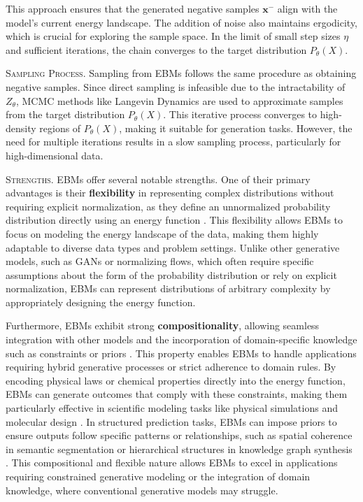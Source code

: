 This approach ensures that the generated negative samples \(\mathbf{x}^-\) align with the model's current energy landscape. The addition of noise also maintains ergodicity, which is crucial for exploring the sample space. In the limit of small step sizes \(\eta\) and sufficient iterations, the chain converges to the target distribution \(P_\theta(X)\).

\textsc{Sampling Process.} Sampling from EBMs follows the same procedure as obtaining negative samples. Since direct sampling is infeasible due to the intractability of \( Z_\theta \), MCMC methods like Langevin Dynamics are used to approximate samples from the target distribution \( P_\theta(X) \). This iterative process converges to high-density regions of \( P_\theta(X) \), making it suitable for generation tasks. However, the need for multiple iterations results in a slow sampling process, particularly for high-dimensional data.

\textsc{Strengths.} EBMs offer several notable strengths. One of their primary advantages is their \textbf{flexibility} in representing complex distributions without requiring explicit normalization, as they define an unnormalized probability distribution directly using an energy function \cite{lecun2006tutorial}. This flexibility allows EBMs to focus on modeling the energy landscape of the data, making them highly adaptable to diverse data types and problem settings. Unlike other generative models, such as GANs or normalizing flows, which often require specific assumptions about the form of the probability distribution or rely on explicit normalization, EBMs can represent distributions of arbitrary complexity by appropriately designing the energy function.

Furthermore, EBMs exhibit strong \textbf{compositionality}, allowing seamless integration with other models and the incorporation of domain-specific knowledge such as constraints or priors \cite{du2019implicit, grathwohl2020your}. This property enables EBMs to handle applications requiring hybrid generative processes or strict adherence to domain rules. By encoding physical laws or chemical properties directly into the energy function, EBMs can generate outcomes that comply with these constraints, making them particularly effective in scientific modeling tasks like physical simulations and molecular design \cite{du2019implicit}. In structured prediction tasks, EBMs can impose priors to ensure outputs follow specific patterns or relationships, such as spatial coherence in semantic segmentation or hierarchical structures in knowledge graph synthesis \cite{grathwohl2020your, lecun2006tutorial}. This compositional and flexible nature allows EBMs to excel in applications requiring constrained generative modeling or the integration of domain knowledge, where conventional generative models may struggle.

